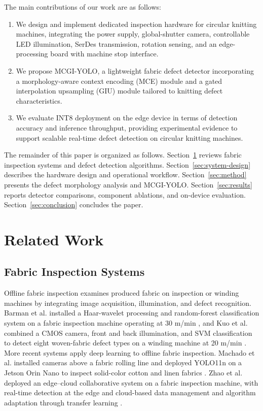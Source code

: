 \documentclass[a4paper,fleqn]{cas-dc}
\newcommand{\model}{MCGI-YOLO\xspace}
\begin{document}
The main contributions of our work are as follows:
\begin{enumerate}
  \renewcommand{\labelenumi}{\arabic{enumi})}
  \item We design and implement dedicated inspection hardware for circular knitting machines, integrating the power supply, global-shutter camera, controllable LED illumination, SerDes transmission, rotation sensing, and an edge-processing board with machine stop interface.
  \item We propose \model, a lightweight fabric defect detector incorporating a morphology-aware context encoding (MCE) module and a gated interpolation upsampling (GIU) module tailored to knitting defect characteristics.
  \item We evaluate INT8 deployment on the edge device in terms of detection accuracy and inference throughput, providing experimental evidence to support scalable real-time defect detection on circular knitting machines.
\end{enumerate}

The remainder of this paper is organized as follows. Section~\ref{sec:related-work} reviews fabric inspection systems and defect detection algorithms. Section~\ref{sec:system-design} describes the hardware design and operational workflow. Section~\ref{sec:method} presents the defect morphology analysis and \model. Section~\ref{sec:results} reports detector comparisons, component ablations, and on-device evaluation. Section~\ref{sec:conclusion} concludes the paper.

\section{Related Work}
\label{sec:related-work}
\subsection{Fabric Inspection Systems}
Offline fabric inspection examines produced fabric on inspection or winding machines by integrating image acquisition, illumination, and defect recognition. Barman et al. installed a Haar-wavelet processing and random-forest classification system on a fabric inspection machine operating at 30 m/min \cite{barman2022inspectionmachine}, and Kuo et al. combined a CMOS camera, front and back illumination, and SVM classification to detect eight woven-fabric defect types on a winding machine at 20 m/min \cite{kuo2022woveninspection}. More recent systems apply deep learning to offline fabric inspection. Machado et al. installed cameras above a fabric rolling line and deployed YOLO11n on a Jetson Orin Nano to inspect solid-color cotton and linen fabrics \cite{machado2025edgefabric}. Zhao et al. deployed an edge--cloud collaborative system on a fabric inspection machine, with real-time detection at the edge and cloud-based data management and algorithm adaptation through transfer learning \cite{zhao2020edgecloud}.
\end{document}
